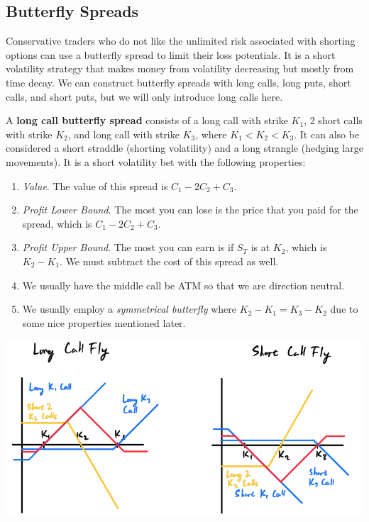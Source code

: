\documentclass{article}
\begin{document}
  \subsection{Butterfly Spreads}

    Conservative traders who do not like the unlimited risk associated with shorting options can use a butterfly spread to limit their loss potentials. It is a short volatility strategy that makes money from volatility decreasing but mostly from time decay. We can construct butterfly spreads with long calls, long puts, short calls, and short puts, but we will only introduce long calls here. 

    \begin{definition}
      A \textbf{long call butterfly spread} consists of a long call with strike $K_1$, 2 short calls with strike $K_2$, and long call with strike $K_3$, where $K_1 < K_2 < K_3$. It can also be considered a short straddle (shorting volatility) and a long strangle (hedging large movements). It is a short volatility bet with the following properties: 
      \begin{enumerate}
        \item \textit{Value}. The value of this spread is $C_1 - 2C_2 + C_3$. 
        \item \textit{Profit Lower Bound}. The most you can lose is the price that you paid for the spread, which is $C_1 - 2C_2 + C_3$. 
        \item \textit{Profit Upper Bound}. The most you can earn is if $S_T$ is at $K_2$, which is $K_2 - K_1$. We must subtract the cost of this spread as well. 
        \item We usually have the middle call be ATM so that we are direction neutral. 
        \item We usually employ a \textit{symmetrical butterfly} where $K_2 - K_1 = K_3 - K_2$ due to some nice properties mentioned later. 
      \end{enumerate}

      \begin{center}
        \includegraphics[scale=0.35]{img/call_fly.png}
      \end{center}
    \end{definition}
\end{document}
